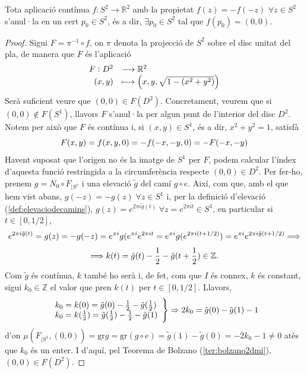 \documentclass[../main.tex]{subfiles}
\begin{document}
\begin{ter}
\label{ter:teoremadeborsukulam} Tota aplicació contínua $f:S^2\rightarrow\mathbb{R}^2$ amb la propietat $f(z)= -f(-z)$ $\forall z\in S^2$ s'anul·la en un cert $p_0\in S^2$, és a dir, $\exists p_0\in S^2$ tal que $f(p_0) = (0,0)$.
\end{ter}
\begin{proof}
Sigui $F = \pi^{-1}\circ f$, on $\pi$ denota la projecció de $S^2$ sobre el disc unitat del pla, de manera que $F$ és l'aplicació
\begin{equation}
    \notag
    \begin{array}{rl}
        F:D^2 & \longrightarrow\mathbb{R}^2 \\
        (x,y) & \longmapsto \left(x,y,\sqrt{1-(x^2+y^2)}\right)
    \end{array}
\end{equation}
Serà suficient veure que $(0,0)\in F(D^2)$. Concretament, veurem que si $(0,0)\not\in F(S^1)$, llavors $F$ s'anul·la per algun punt de l'interior del disc $D^2$. Notem per això que $F$ és contínua i, si $(x,y)\in S^1$, és a dir, $x^2+y^2=1$, satisfà
\begin{equation}
    \notag
    F(x,y) = f(x,y,0) = -f(-x,-y,0) = -F(-x,-y)
\end{equation}
Havent suposat que l'origen no és la imatge de $S^1$ per $F$, podem calcular l'índex d'aquesta funció restringida a la circumferència respecte $(0,0)\in D^2$. Per fer-ho, prenem $g = N_0\circ F_{|S^1}$ i una elevació $\tilde{g}$ del camí $g\circ e$. Així, com que, amb el que hem vist abans, $g(-z) = -g(z)\;\forall z\in S^1$ i, per la definició d'elevació (\ref{def:elevaciodecamins}), $g(z)=e^{2\pi i\tilde{g}(t)}\;\forall z = e^{2\pi it}\in S^1$, en particular si $t\in [0,1/2]$,
\begin{equation}
    \notag
    e^{2\pi i\tilde{g}(t)} = g(z) = -g(-z) = e^{\pi i}g(e^{\pi i}e^{2\pi it} = e^{\pi i}g(e^{2\pi i(t+1/2)}) = e^{\pi i}e^{2\pi i\tilde{g}(t+1/2)} \Longrightarrow
\end{equation}
\begin{equation}
    \notag
    \Longrightarrow k(t) = \tilde{g}(t)-\frac{1}{2}-\tilde{g}(t+\frac{1}{2})\in\mathbb{Z}.
\end{equation}
Com $\tilde{g}$ és contínua, $k$ també ho serà i, de fet, com que $I$ és connex, $k$ és constant, sigui $k_0\in\mathbb{Z}$ el valor que pren $k(t)$ per $t\in [0,1/2]$. Llavors,
\begin{equation}
    \notag
    \left.
    \begin{array}{ll}
        k_0 = k(0) = \tilde{g}(0)-\frac{1}{2}-\tilde{g}(\frac{1}{2})\\
        k_0 = k(\frac{1}{2}) = \tilde{g}(\frac{1}{2})-\frac{1}{2}-\tilde{g}(1)
    \end{array}
    \right\} \Rightarrow 2k_0=\tilde{g}(0)-\tilde{g}(1) -1
\end{equation}
d'on $\mu(F_{|S^1},(0,0))=\mathrm{gr}g = \mathrm{gr}(g\circ e) = \tilde{g}(1)-\tilde{g}(0) = -2k_0-1\not=0$ atès que $k_0$ és un enter. I d'aquí, pel Teorema de Bolzano (\ref{ter:bolzano2dmi}), $(0,0)\in F(D^2)$.
\end{proof}
\end{document}
